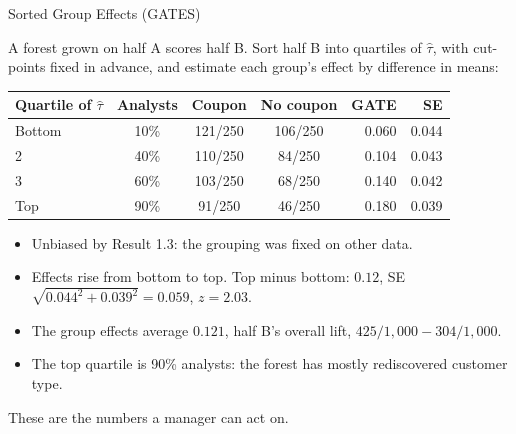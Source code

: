 \documentclass[aspectratio=169, 11pt, handout]{beamer}
\newcommand{\hatt}{\hat{\tau}}
\begin{document}
\begin{frame}{Sorted Group Effects (GATES)}

A forest grown on half A scores half B. Sort half B into quartiles of $\hatt$, with cut-points fixed in advance, and estimate each group's effect by difference in means:

\begin{center}
\small
\begin{tabular}{lcccrr}
\toprule
\textbf{Quartile of $\hatt$} & \textbf{Analysts} & \textbf{Coupon} & \textbf{No coupon} & \textbf{GATE} & \textbf{SE} \\
\midrule
Bottom & 10\% & 121/250 & 106/250 & 0.060 & 0.044 \\
2 & 40\% & 110/250 & 84/250 & 0.104 & 0.043 \\
3 & 60\% & 103/250 & 68/250 & 0.140 & 0.042 \\
Top & 90\% & 91/250 & 46/250 & 0.180 & 0.039 \\
\bottomrule
\end{tabular}
\end{center}

\begin{itemize}
  \item Unbiased by Result 1.3: the grouping was fixed on other data.
  \item Effects rise from bottom to top. Top minus bottom: $0.12$, SE $\sqrt{0.044^2 + 0.039^2} = 0.059$, $z = 2.03$.
  \item The group effects average $0.121$, half B's overall lift, $425/1{,}000 - 304/1{,}000$.
  \item The top quartile is 90\% analysts: the forest has mostly rediscovered customer type.
\end{itemize}

These are the numbers a manager can act on.
\end{frame}
\end{document}
